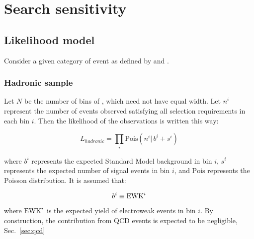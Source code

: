 \section{Search sensitivity}
\label{sec:sensitivity}
\subsection{Likelihood model}

Consider a given category of event as defined by \njet and \nb.

\subsubsection{Hadronic sample}
\label{sec:hadronicLikelihood}
Let $N$ be the number of bins of \HT, which need not have equal width.
Let $n^i$ represent the number of events observed satisfying all
selection requirements in each \HT bin $i$.  Then the likelihood of
the observations is written this way:

\begin{equation}
L_{hadronic}=\prod_i \mathrm{Pois}(n^i |\, b^i + s^i)
\label{eq:hadronicLikelihood}
\end{equation}

where $b^i$ represents the expected Standard Model background in bin
$i$, $s^i$ represents the expected number of signal events in bin $i$,
and $\mathrm{Pois}$ represents the Poisson distribution.  It is
assumed that:

\begin{equation}
  b^i\equiv \ewk^i
  \label{eq:ewkTotal}
\end{equation}

where $\ewk^i$ is the expected yield of electroweak events in bin $i$.
By construction, the contribution from QCD events is expected to be negligible, 
Sec.~\ref{sec:qcd}



